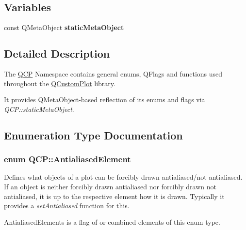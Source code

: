 \subsection*{Variables}
\begin{DoxyCompactItemize}
\item 
const Q\+Meta\+Object {\bfseries static\+Meta\+Object}
\end{DoxyCompactItemize}


\subsection{Detailed Description}
The \hyperlink{namespace_q_c_p}{Q\+CP} Namespace contains general enums, Q\+Flags and functions used throughout the \hyperlink{class_q_custom_plot}{Q\+Custom\+Plot} library.

It provides Q\+Meta\+Object-\/based reflection of its enums and flags via {\itshape Q\+C\+P\+::static\+Meta\+Object}. 

\subsection{Enumeration Type Documentation}
\subsubsection[{\texorpdfstring{Antialiased\+Element}{AntialiasedElement}}]{\setlength{\rightskip}{0pt plus 5cm}enum {\bf Q\+C\+P\+::\+Antialiased\+Element}}\hypertarget{namespace_q_c_p_ae55dbe315d41fe80f29ba88100843a0c}{}\label{namespace_q_c_p_ae55dbe315d41fe80f29ba88100843a0c}
Defines what objects of a plot can be forcibly drawn antialiased/not antialiased. If an object is neither forcibly drawn antialiased nor forcibly drawn not antialiased, it is up to the respective element how it is drawn. Typically it provides a {\itshape set\+Antialiased} function for this.

{\ttfamily Antialiased\+Elements} is a flag of or-\/combined elements of this enum type.

